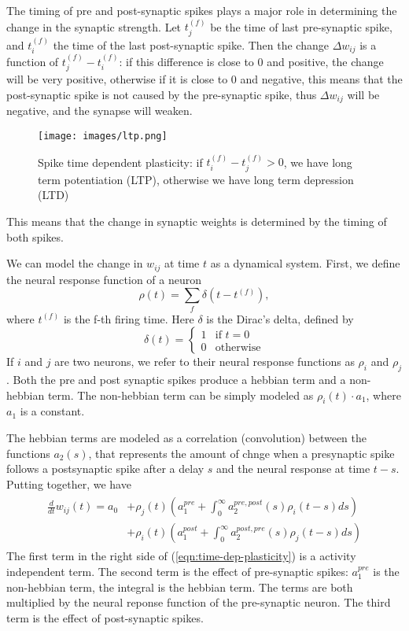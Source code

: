 \documentclass[oneside]{book}
\theoremstyle{definition}
\theoremstyle{plain}
\begin{document}
The timing of pre and post-synaptic spikes plays a major role in determining the change in the synaptic strength. Let $t_j^{(f)}$ be the time of last pre-synaptic spike, and $t_i^{(f)}$ the time of the last post-synaptic spike. Then the change $\Delta w_{ij}$ is a function of  $t_{j}^{(f)}-t_i^{(f)}$: if this difference is close to 0 and positive, the change will be very positive, otherwise if it is close to  0 and negative, this means that the post-synaptic spike is not caused by the pre-synaptic spike, thus $\Delta w_{ij}$ will be negative, and the synapse will weaken.
\begin{figure}
    \centering
    \texttt{[image: images/ltp.png]}
    \caption{Spike time dependent plasticity: if $t_{i}^{(f)}-t_{j}^{(f)}>0$, we have long term potentiation (LTP), otherwise we have long term depression (LTD)}
    \label{fig:spike-time-ltp}
\end{figure}
This means that the change in synaptic weights is determined by the timing of both spikes. 

We can model the change in  $w_{ij}$ at time $t$ as a dynamical system.
First, we define the neural response function of a neuron
\begin{equation}
    \rho(t) = \sum_{f} \delta(t-t^{(f)}),
\end{equation}
where $t^{(f)}$ is the f-th firing time. Here $\delta$ is the Dirac's delta, defined by
\[
    \delta(t) = \begin{cases}
        1 & \text{if } t=0\\
        0 & \text{otherwise}
    \end{cases}
\]
If $i$ and $j$ are two neurons, we refer to their neural response functions as $\rho_i$ and $\rho_j$. 
Both the pre and post synaptic spikes produce a hebbian term and a non-hebbian term. The non-hebbian term can be simply modeled as $\rho_i(t) \cdot a_1$, where $a_1$ is a constant. 

The hebbian terms are modeled as a correlation (convolution) between the functions $a_2(s)$, that represents the amount of chnge when a presynaptic spike follows a postsynaptic spike after a delay $s$ and the neural response at time $t-s$. Putting together, we have
\begin{align}
\label{eqn:time-dep-plasticity}
\begin{split}
    \frac{d}{dt} w_{ij}(t) = a_0 &+ \rho_j(t)\left(  a_1^{pre} + \int_0^\infty a_2^{pre,post}(s) \rho_i(t-s) ds\right)
    \\& + 
    \rho_i (t)\left(  a_1^{post} + \int_0^\infty a_2^{post,pre}(s) \rho_j(t-s) ds\right)
\end{split}
\end{align}
The first term in the right side of (\ref{eqn:time-dep-plasticity}) is a activity independent term. The second term is the effect of pre-synaptic spikes: $a_1^{pre}$ is the non-hebbian term, the integral is the hebbian term.
The terms are both multiplied by the neural reponse function of the pre-synaptic neuron. The third term is the effect of post-synaptic spikes. 
\end{document}
